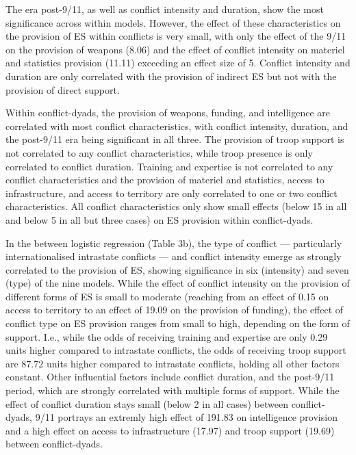 \documentclass[
]{article}
\begin{document}
The era post-9/11, as well as conflict intensity and duration, show the
most significance across within models. However, the effect of these
characteristics on the provision of ES within conflicts is very small,
with only the effect of the 9/11 on the provision of weapons (8.06) and
the effect of conflict intensity on materiel and statistics provision
(11.11) exceeding an effect size of 5. Conflict intensity and duration
are only correlated with the provision of indirect ES but not with the
provision of direct support.

Within conflict-dyads, the provision of weapons, funding, and
intelligence are correlated with most conflict characteristics, with
conflict intensity, duration, and the post-9/11 era being significant in
all three. The provision of troop support is not correlated to any
conflict characteristics, while troop presence is only correlated to
conflict duration. Training and expertise is not correlated to any
conflict characteristics and the provision of materiel and statistics,
access to infrastructure, and access to territory are only correlated to
one or two conflict characteristics. All conflict characteristics only
show small effects (below 15 in all and below 5 in all but three cases)
on ES provision within conflict-dyads.

In the between logistic regression (Table 3b), the type of conflict ---
particularly internationalised intrastate conflicts --- and conflict
intensity emerge as strongly correlated to the provision of ES, showing
significance in six (intensity) and seven (type) of the nine models.
While the effect of conflict intensity on the provision of different
forms of ES is small to moderate (reaching from an effect of 0.15 on
access to territory to an effect of 19.09 on the provision of funding),
the effect of conflict type on ES provision ranges from small to high,
depending on the form of support. I.e., while the odds of receiving
training and expertise are only 0.29 units higher compared to intrastate
conflicts, the odds of receiving troop support are 87.72 units higher
compared to intrastate conflicts, holding all other factors constant.
Other influential factors include conflict duration, and the post-9/11
period, which are strongly correlated with multiple forms of support.
While the effect of conflict duration stays small (below 2 in all cases)
between conflict-dyads, 9/11 portrays an extremly high effect of 191.83
on intelligence provision and a high effect on access to infrastructure
(17.97) and troop support (19.69) between conflict-dyads.
\end{document}

